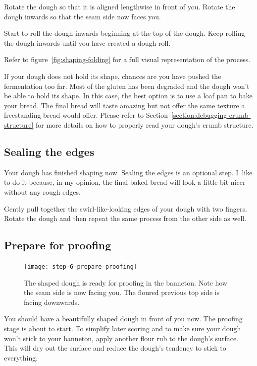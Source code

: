 Rotate the dough so that it is aligned lengthwise in front of you.
Rotate the dough inwards so that the seam side
now faces you.

Start to roll the dough inwards beginning at the top of the dough.
Keep rolling the dough inwards until you have created a dough roll.

Refer to figure~\ref{fig:shaping-folding} for a full visual
representation of the process.

If your dough does not hold its shape, chances are you have pushed
the fermentation too far. Most of the gluten has been degraded
and the dough won't be able to hold its shape. In this case,
the best option is to use a loaf pan to bake your bread. The
final bread will taste amazing but not offer the same texture
a freestanding bread would offer. Please refer to
Section~\ref{section:debugging-crumb-structure} for more
details on how to properly read your dough's crumb structure.

\subsection[Sealing]{Sealing the edges}

Your dough has finished shaping now. Sealing the edges
is an optional step. I~like to do it because, in my opinion,
the final baked bread will look a little bit nicer without
any rough edges.

Gently pull together the swirl-like-looking edges of your dough
with two fingers. Rotate the dough and then repeat the same process
from the other side as well.

\subsection[Proofing preparation]{Prepare for proofing}

\begin{figure}[htb!]
  \texttt{[image: step-6-prepare-proofing]}
  \caption{The shaped dough is ready for proofing in the banneton. Note how the seam side
  is now facing you. The floured previous top side is facing downwards.}%
  \label{fig:shaping-prepare-proofing}
\end{figure}

You should have a beautifully shaped dough in front of you now.
The proofing stage is about to start. To simplify later
scoring and to make sure your dough won't stick to your banneton,
apply another flour rub to the dough's surface. This
will dry out the surface and reduce the dough's tendency
to stick to everything.

